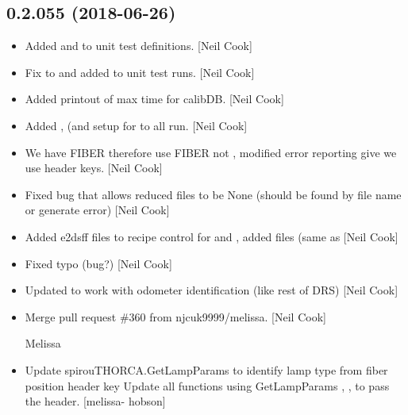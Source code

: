 \documentclass[a4paper,10pt,english]{report}
\begin{document}
\subsection{0.2.055 (2018-06-26)}
\label{\detokenize{misc/changelog:id410}}\begin{itemize}
\item {} 
Added  and  to unit test definitions. {[}Neil Cook{]}

\item {} 
Fix to  and  added to unit test runs. {[}Neil Cook{]}

\item {} 
Added printout of max time for calibDB. {[}Neil Cook{]}

\item {} 
Added ,  (and setup for  to all run. {[}Neil
Cook{]}

\item {} 
We have FIBER therefore use FIBER not , modified error
reporting give we use header keys. {[}Neil Cook{]}

\item {} 
Fixed bug that allows reduced files to be None (should be found by
file name or generate error) {[}Neil Cook{]}

\item {} 
Added e2dsff files to recipe control for  and , added
 files (same as  {[}Neil Cook{]}

\item {} 
Fixed typo (bug?) {[}Neil Cook{]}

\item {} 
Updated to work with odometer identification (like rest of DRS) {[}Neil
Cook{]}

\item {} 
Merge pull request \#360 from njcuk9999/melissa. {[}Neil Cook{]}

Melissa

\item {} 
Update spirouTHORCA.GetLampParams to identify lamp type from fiber
position header key Update all functions using GetLampParams ,
,   to pass the header. {[}melissa-
hobson{]}


\end{itemize}
\end{document}
